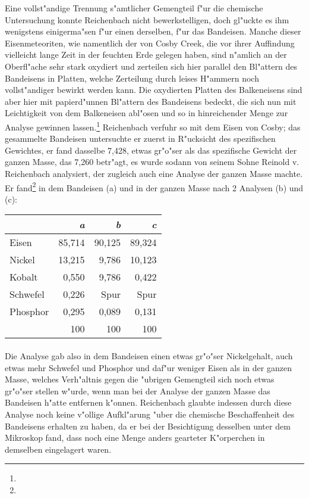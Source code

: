 \documentclass[a4paper, 11pt, oneside]{article}
\begin{document}
Eine vollst"andige Trennung s"amtlicher Gemengteil f"ur die chemische Untersuchung konnte Reichenbach nicht bewerkstelligen, doch gl"uckte es ihm wenigstens einigerma"sen f"ur einen derselben, f"ur das Bandeisen. Manche dieser Eisenmeteoriten, wie namentlich der von Cosby Creek, die vor ihrer Auffindung vielleicht lange Zeit in der feuchten Erde gelegen haben, sind n"amlich an der Oberfl"ache sehr stark oxydiert und zerteilen sich hier parallel den Bl"attern des Bandeisens in Platten, welche Zerteilung durch leises H"ammern noch vollst"andiger bewirkt werden kann. Die oxydierten Platten des Balkeneisens sind aber hier mit papierd"unnen Bl"attern des Bandeisens bedeckt, die sich nun mit Leichtigkeit von dem Balkeneisen abl"osen und so in hinreichender Menge zur Analyse gewinnen lassen.\footnote{} Reichenbach verfuhr so mit dem Eisen von Cosby; das gesammelte Bandeisen untersuchte er zuerst in R"ucksicht des spezifischen Gewichtes, er fand dasselbe 7,428, etwas gr"o"ser als das spezifische Gewicht der ganzen Masse, das 7,260 betr"agt, es wurde sodann von seinem Sohne Reinold v. Reichenbach analysiert, der zugleich auch eine Analyse der ganzen Masse machte. Er fand\footnote{} in dem Bandeisen (a) und in der ganzen Masse nach 2 Analysen (b) und (c):
\begin{center}
\begin{tabular}{ |l|r|r|r| }
    \hline
     & \emph{a} & \emph{b} & \emph{c}\\
    \hline\hline
    Eisen & 85,714 & 90,125 & 89,324\\\hline
    Nickel & 13,215 & 9,786 & 10,123\\\hline
    Kobalt & 0,550 & 9,786 & 0,422\\\hline
    Schwefel & 0,226 & Spur & Spur\\\hline
    Phosphor & 0,295 & 0,089 & 0,131\\\hline
     & 100 & 100 & 100\\
    \hline
\end{tabular}
\end{center}
\paragraph{}
Die Analyse gab also in dem Bandeisen einen etwas gr"o"ser Nickelgehalt, auch etwas mehr Schwefel und Phosphor und daf"ur weniger Eisen als in der ganzen Masse, welches Verh"altnis gegen die "ubrigen Gemengteil sich noch etwas gr"o"ser stellen w"urde, wenn man bei der Analyse der ganzen Masse das Bandeisen h"atte entfernen k"onnen. Reichenbach glaubte indessen durch diese Analyse noch keine v"ollige Aufkl"arung "uber die chemische Beschaffenheit des Bandeisens erhalten zu haben, da er bei der Besichtigung desselben unter dem Mikroskop fand, dass noch eine Menge anders gearteter K"orperchen in demselben eingelagert waren.
\end{document}
